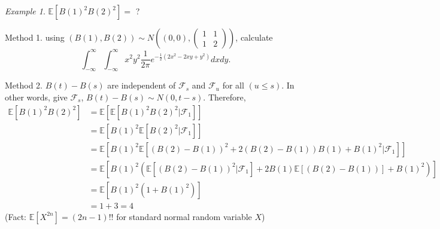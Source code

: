 \documentclass[12pt]{report}
\newcommand{\F}{\mathcal{F}}
\newcommand{\E}{\mathbb{E}}
\renewcommand{\1}{\mathbb{1}}
\theoremstyle{break}
\theoremstyle{newdef}
\theoremstyle{remark}
\newtheorem*{exmp}{Example} %
\begin{document}
\begin{exmp}
$\E[B(1)^2B(2)^2] = $ ?

Method 1.
using $(B(1), B(2)) \sim N\left((0,0), 
\begin{pmatrix}
1&1\\1&2
\end{pmatrix}
\right)
$, calculate
$$
\int_{-\infty}^\infty \int_{-\infty}^\infty
x^2y^2 \frac{1}{2\pi} e^{-\frac{1}{2} \left(2x^2 - 2xy + y^2\right)}dxdy.
$$

Method 2.
$B(t) - B(s)$ are independent of $\F_s$ and $\F_u$ for all $(u \leq s)$.
In other words, give $\F_s$, $B(t) - B(s) \sim N(0,t-s)$.
Therefore,
$$
\begin{aligned}
\E[B(1)^2B(2)^2]
&= \E[\E[B(1)^2B(2)^2 | \F_1]]\\
&= \E[B(1)^2 \E[B(2)^2 | \F_1]]\\
&= \E\left[B(1)^2\E[(B(2) - B(1))^2 + 2(B(2) - B(1))B(1) + B(1)^2 | \F_1]\right]\\
&= \E\left[B(1)^2\left(\E[(B(2) - B(1))^2|\F_1] + 2B(1)\E[(B(2) - B(1))] + B(1)^2 \right)\right]\\
&= \E\left[B(1)^2\left( 1 + B(1)^2 \right)\right]\\
&= 1 + 3 = 4
\end{aligned}
$$
(Fact: $\E[X^{2n}] = (2n-1)!!$ for standard normal random variable $X$)
\end{exmp}
\end{document}
